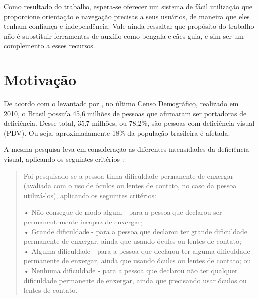 \documentclass[english,brazilian]{UNISINOSmonografia}
\begin{document}
Como resultado do trabalho, espera-se oferecer um sistema de fácil utilização que proporcione orientação e navegação precisas a seus usuários, de maneira que eles tenham confiança e independência. Vale ainda ressaltar que propósito do trabalho não é substituir ferramentas de auxílio como bengala e cães-guia, e sim ser um complemento a esses recursos.

	\section{Motivação}


De acordo com o levantado por , no último Censo Demográfico, realizado em 2010, o Brasil possuía 45,6 milhões de pessoas que afirmaram ser portadoras de deficiência. Desse total, 35,7 milhões, ou 78,2\%, são pessoas com deficiência visual (PDV). Ou seja, aproximadamente 18\% da população brasileira é afetada.

A mesma pesquisa leva em consideração as diferentes intensidades da deficiência visual, aplicando os seguintes critérios \cite{IBGE2010}: 

\begin{quote}
	Foi pesquisado se a pessoa tinha dificuldade permanente de enxergar (avaliada com o uso de óculos ou lentes de contato, no caso da pessoa utilizá-los), aplicando os seguintes critérios:
		
	• Não consegue de modo algum - para a pessoa que declarou ser permanentemente incapaz de enxergar; \\
	• Grande dificuldade - para a pessoa que declarou ter grande dificuldade permanente de enxergar, ainda que usando óculos ou lentes de contato; \\
	• Alguma dificuldade - para a pessoa que declarou ter alguma dificuldade permanente de enxergar, ainda que usando óculos ou lentes de contato; ou \\
	• Nenhuma dificuldade - para a pessoa que declarou não ter qualquer dificuldade permanente de enxergar, ainda que precisando usar óculos ou lentes de contato.
\end{quote}
\end{document}
